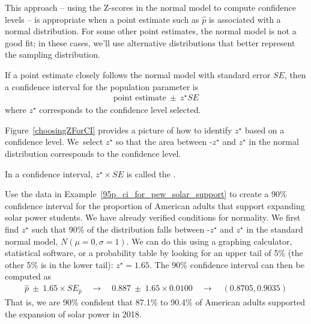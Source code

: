 This approach -- using the Z-scores in the
normal model to compute confidence levels --
is appropriate when a point estimate such as $\hat{p}$
is associated with a normal distribution.
For some other point estimates, the normal model is not a good fit;
in these cases, we'll use alternative distributions that better
represent the sampling distribution.

\begin{termBox}{
  If a point estimate closely follows the normal model with
  standard error $SE$, then a confidence interval
  for the population parameter is
  \begin{align*}
  \text{point estimate}\ \pm\ z^{\star} SE
  \end{align*}
  where $z^{\star}$ corresponds to the confidence level selected.}
\end{termBox}

Figure~\ref{choosingZForCI} provides a picture of how to identify
$z^{\star}$ based on a confidence level. We~select $z^{\star}$
so that the area between -$z^{\star}$ and $z^{\star}$ in the normal
distribution corresponds to the confidence level. 

\begin{termBox}{
\label{marginOfErrorTermBox}
In a confidence interval, $z^{\star}\times SE$ is called the
.}
\end{termBox}

\begin{example}{Use the data in
    Example~\ref{95p_ci_for_pew_solar_support} to
    create a 90\% confidence interval for the proportion of American
    adults that support expanding solar power students.
    We have already verified conditions for normality.}
  We first find $z^{\star}$ such that 90\% of the distribution falls
  between -$z^{\star}$ and $z^{\star}$ in the standard normal model,
  $N(\mu=0, \sigma=1)$. We can do this using a graphing calculator,
  statistical software, or a probability table by looking for an upper
  tail of 5\% (the other 5\% is in the lower tail): $z^{\star}=1.65$.
  The 90\% confidence interval can then be computed as
  \begin{align*}
  \hat{p}\ \pm\ 1.65\times SE_{\hat{p}}
      \quad\to\quad 0.887\ \pm\ 1.65\times 0.0100
      \quad\to\quad (0.8705, 0.9035)
  \end{align*}
  That is, we are 90\% confident that 87.1\% to 90.4\% of American
  adults supported the expansion of solar power in 2018.
\end{example}



